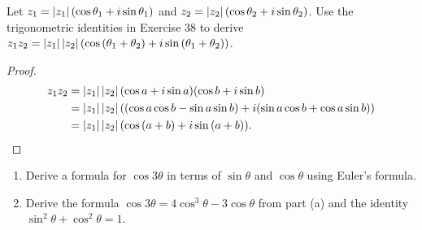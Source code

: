 \begin{exercise}
    Let $z_{1} = \left\vert{z_{1}}\right\vert(\cos{\theta_{1}} + i\sin{\theta_{1}})$ and $z_{2} = \left\vert{z_{2}}\right\vert(\cos{\theta_{2}} + i\sin{\theta_{2}})$. Use the trigonometric identities in Exercise 38 to derive $z_{1}z_{2} = \left\vert{z_{1}}\right\vert\left\vert{z_{2}}\right\vert(\cos{(\theta_{1} + \theta_{2})} + i\sin{(\theta_{1} + \theta_{2})})$.
\end{exercise}

\begin{proof}
    \begin{align*}
        z_{1}z_{2} & = \left\vert{z_{1}}\right\vert\left\vert{z_{2}}\right\vert(\cos a + i\sin a)(\cos b + i\sin b)                             \\
                   & = \left\vert{z_{1}}\right\vert\left\vert{z_{2}}\right\vert((\cos a\cos b - \sin a\sin b) + i(\sin a\cos b + \cos a\sin b)) \\
                   & = \left\vert{z_{1}}\right\vert\left\vert{z_{2}}\right\vert(\cos{(a+b)} + i\sin{(a+b)}).
    \end{align*}
\end{proof}

\begin{exercise}
    \begin{enumerate}[topsep=0pt,itemsep=0pt,label={\textbf{\alph*.}}]
        \item Derive a formula for $\cos{3\theta}$ in terms of $\sin{\theta}$ and $\cos{\theta}$ using Euler's formula.
        \item Derive the formula $\cos{3\theta} = 4\cos^{3}{\theta} - 3\cos{\theta}$ from part (a) and the identity $\sin^{2}{\theta} + \cos^{2}{\theta} = 1$.
    \end{enumerate}
\end{exercise}

